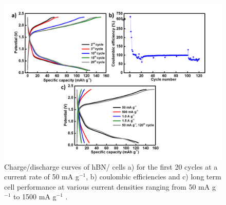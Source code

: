 \begin{figure}[tbh!]
\centering
\includegraphics[width=\textwidth]{Figures/BOhBN/hBNBO5050}
\caption{Charge/discharge curves of hBN/  cells a) for the first 20 cycles at a current rate of 50 mA g$^{-1}$, b) coulombic efficiencies and c) long term cell performance at various current densities ranging from 50 mA g$^{-1}$ to 1500 mA g$^{-1}$ .}
\label{Figures/BOhBN:hBNBO5050}
\end{figure}

